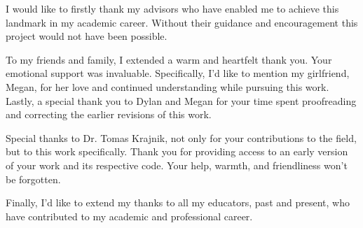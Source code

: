

    \begin{acknowledgements}
      I would like to firstly thank my advisors who have enabled me to achieve
      this landmark in my academic career. Without their guidance and
      encouragement this project would not have been possible.

      To my friends and family, I extended a warm and heartfelt thank you. Your
      emotional support was invaluable. Specifically, I'd like to mention
      my girlfriend, Megan, for her love and continued understanding while
      pursuing this work. Lastly, a special thank you to Dylan and Megan
      for your time spent proofreading and correcting the earlier
      revisions of this work.

      Special thanks to Dr. Tomas Krajnik, not only for your contributions to
      the field, but to this work specifically. Thank you for providing access
      to an early version of your work and its respective code. Your help,
      warmth, and friendliness won't be forgotten.

      Finally, I'd like to extend my thanks to all my educators, past and present,
      who have contributed to my academic and professional career.

    \end{acknowledgements}

